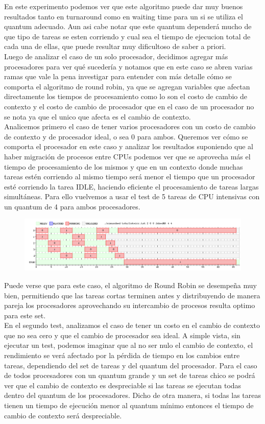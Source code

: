En este experimento podemos ver que este algoritmo puede dar muy buenos resultados tanto en turnaround como en waiting time para un si se utiliza el quantum adecuado. Aun asi cabe notar que este quantum dependerá mucho de que tipo de tareas se esten corriendo y cual sea el tiempo de ejecucion total de cada una de ellas, que puede resultar muy dificultoso de saber a priori. 
\\
Luego de analizar el caso de un solo procesador, decidimos agregar más procesadores para ver qué sucedería y notamos que en este caso se abren varias ramas que vale la pena investigar para entender con más detalle cómo se comporta el algoritmo de round robin, ya que se agregan variables que afectan directamente los tiempos de procesamiento como lo son el costo de cambio de contexto y el costo de cambio de procesador que en el caso de un procesador no se nota ya que el unico que afecta es el cambio de contexto.
\\
Analicemos primero el caso de tener varios procesadores con un costo de cambio de contexto y de procesador ideal, o sea 0 para ambos. Queremos ver cómo se comporta el procesador en este caso y analizar los resultados suponiendo que al haber migración de procesos entre CPUs podemos ver que se aprovecha más el tiempo de procesamiento de los mismos y que en un contexto donde muchas tareas estén corriendo al mismo tiempo será menor el tiempo que un procesador esté corriendo la tarea IDLE, haciendo eficiente el procesamiento de tareas largas simultáneas. Para ello vuelvemos a usar el test de 5 tareas de CPU intensivas con un quantum de 4 para ambos procesadores.
\\
\begin{figure}[H]
  \centering
\includegraphics[scale=0.45]{graficos/parte2/rr/4.png}
  \caption[Caption for LOF]{}
\end{figure}
Puede verse que para este caso, el algoritmo de Round Robin se desempeña muy bien, permitiendo que las tareas cortas terminen antes y distribuyendo de manera pareja los procesadores aprovechando su intercambio de procesos resulta optimo para este set.
\\
En el segundo test, analizamos el caso de tener un costo en el cambio de contexto que no sea cero y que el cambio de procesador sea ideal. A simple vista, sin ejecutar un test, podemos imaginar que al no ser nulo el cambio de contexto, el rendimiento se verá afectado por la pérdida de tiempo en los cambios entre tareas, dependiendo del set de tareas y del quantum del procesador. Para el caso de todos procesadores con un quantum grande y un set de tareas chico se podrá ver que el cambio de contexto es despreciable si las tareas se ejecutan todas dentro del quantum de los procesadores. Dicho de otra manera, si todas las tareas tienen un tiempo de ejecución menor al quantum mínimo entonces el tiempo de cambio de contexto será despreciable.
